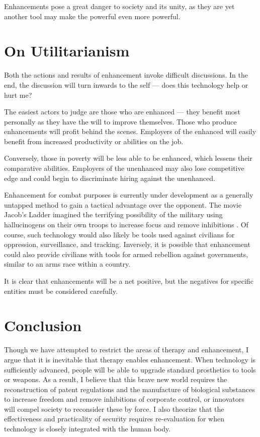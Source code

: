 \documentclass[10pt, oneside, letterpaper]{article}
\begin{document}
\begin{multicols}{2}
	Enhancements pose a great danger to society and its unity, as they are yet another tool may make the powerful even more powerful.
	
	\section{On Utilitarianism}
	
	Both the actions and results of enhancement invoke difficult discussions. In the end, the discussion will turn inwards to the self --- does this technology help or hurt me?
	
	The easiest actors to judge are those who are enhanced --- they benefit most personally as they have the will to improve themselves. Those who produce enhancements will profit behind the scenes. Employers of the enhanced will easily benefit from increased productivity or abilities on the job.
	
	Conversely, those in poverty will be less able to be enhanced, which lessens their comparative abilities.	Employers of the unenhanced may also lose competitive edge and could begin to discriminate hiring against the unenhanced.
	
	Enhancement for combat purposes is currently under development as a generally untapped method to gain a tactical advantage over the opponent. The movie Jacob's Ladder imagined the terrifying possibility of the military using hallucinogens on their own troops to increase focus and remove inhibitions \cite{Lyne1990}. Of course, such technology would also likely be tools used against civilians for oppression, surveillance, and tracking. Inversely, it is possible that enhancement could also provide civilians with tools for armed rebellion against governments, similar to an arms race within a country.
	
	It is clear that enhancements will be a net positive, but the negatives for specific entities must be considered carefully.
	
	\section{Conclusion}
	
	Though we have attempted to restrict the areas of therapy and enhancement, I argue that it is inevitable that therapy enables enhancement. When technology is sufficiently advanced, people will be able to upgrade standard prosthetics to tools or weapons. As a result, I believe that this brave new world requires the reconstruction of patent regulations and the manufacture of biological substances to increase freedom and remove inhibitions of corporate control, or innovators will compel society to reconsider these by force. I also theorize that the effectiveness and practicality of security requires re-evaluation for when technology is closely integrated with the human body.
	

\end{multicols}
\end{document}
